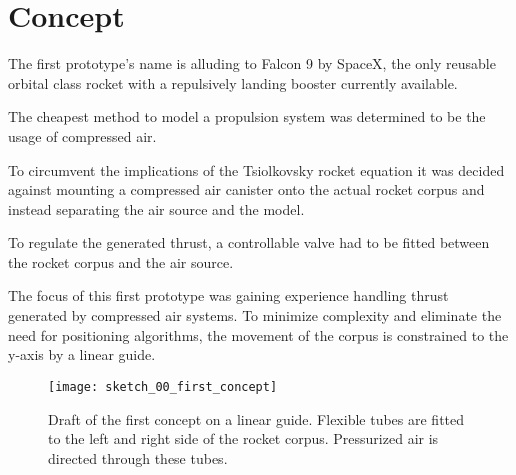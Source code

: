 \section{Concept}
\author{Sebastian Schaffler}

The first prototype's name is alluding to Falcon 9 by SpaceX, the only reusable orbital class rocket with a repulsively landing booster currently available. 

The cheapest method to model a propulsion system was determined to be the usage of compressed air. 

To circumvent the implications of the Tsiolkovsky rocket equation it was decided against mounting a compressed air canister onto the actual rocket corpus and instead separating the air source and the model.

To regulate the generated thrust, a controllable valve had to be fitted between the rocket corpus and the air source. 

The focus of this first prototype was gaining experience handling thrust generated by compressed air systems. To minimize complexity and eliminate the need for positioning algorithms, the movement of the corpus is constrained to the y-axis by a linear guide.

\begin{figure}[H]
\centering

\texttt{[image: sketch\_00\_first\_concept]}

\caption{Draft of the first concept on a linear guide. Flexible tubes are fitted to the left and right side of the rocket corpus. Pressurized air is directed through these tubes.}
\end{figure}